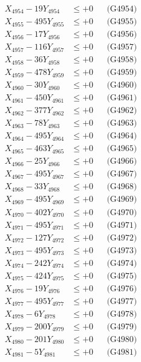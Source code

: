 \documentclass[a4paper,10pt]{article}
\begin{document}
{\begin{align}
X_{4954} - 19Y_{4954} &\leq +0 && \text{(G4954)} \\
X_{4955} - 495Y_{4955} &\leq +0 && \text{(G4955)} \\
X_{4956} - 17Y_{4956} &\leq +0 && \text{(G4956)} \\
X_{4957} - 116Y_{4957} &\leq +0 && \text{(G4957)} \\
X_{4958} - 36Y_{4958} &\leq +0 && \text{(G4958)} \\
X_{4959} - 478Y_{4959} &\leq +0 && \text{(G4959)} \\
X_{4960} - 30Y_{4960} &\leq +0 && \text{(G4960)} \\
\allowbreak
X_{4961} - 450Y_{4961} &\leq +0 && \text{(G4961)} \\
X_{4962} - 377Y_{4962} &\leq +0 && \text{(G4962)} \\
X_{4963} - 78Y_{4963} &\leq +0 && \text{(G4963)} \\
X_{4964} - 495Y_{4964} &\leq +0 && \text{(G4964)} \\
X_{4965} - 463Y_{4965} &\leq +0 && \text{(G4965)} \\
X_{4966} - 25Y_{4966} &\leq +0 && \text{(G4966)} \\
X_{4967} - 495Y_{4967} &\leq +0 && \text{(G4967)} \\
X_{4968} - 33Y_{4968} &\leq +0 && \text{(G4968)} \\
X_{4969} - 495Y_{4969} &\leq +0 && \text{(G4969)} \\
X_{4970} - 402Y_{4970} &\leq +0 && \text{(G4970)} \\
\allowbreak
X_{4971} - 495Y_{4971} &\leq +0 && \text{(G4971)} \\
X_{4972} - 127Y_{4972} &\leq +0 && \text{(G4972)} \\
X_{4973} - 495Y_{4973} &\leq +0 && \text{(G4973)} \\
X_{4974} - 242Y_{4974} &\leq +0 && \text{(G4974)} \\
X_{4975} - 424Y_{4975} &\leq +0 && \text{(G4975)} \\
X_{4976} - 19Y_{4976} &\leq +0 && \text{(G4976)} \\
X_{4977} - 495Y_{4977} &\leq +0 && \text{(G4977)} \\
X_{4978} - 6Y_{4978} &\leq +0 && \text{(G4978)} \\
X_{4979} - 200Y_{4979} &\leq +0 && \text{(G4979)} \\
X_{4980} - 201Y_{4980} &\leq +0 && \text{(G4980)} \\
\allowbreak
X_{4981} - 5Y_{4981} &\leq +0 && \text{(G4981)} \\

\end{align}}
\end{document}
